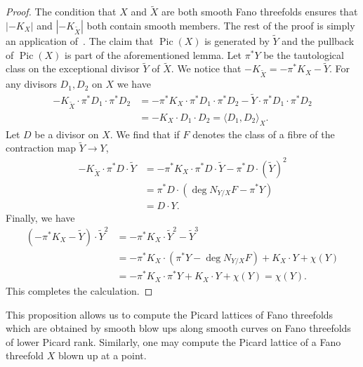 \documentclass[10pt]{amsart}
\numberwithin{equation}{section}
\theoremstyle{plain}
\theoremstyle{definition}
\theoremstyle{remark}
\DeclareMathOperator{\Pic}{Pic}
\begin{document}
\begin{proof}
  The condition that \(X\) and \(\widetilde{X}\) are both smooth Fano threefolds ensures that \(|-K_X|\) and \(|-K_{\widetilde{X}}|\) both contain smooth members. The rest of the proof is simply an application of~\cite[Lemma 2.11]{iskovskikh1977fano}. The claim that \(\Pic(X)\) is generated by \(\widetilde{Y}\) and the pullback of \(\Pic(X)\) is part of the aforementioned lemma. Let \(\pi^*Y\) be the tautological class on the exceptional divisor \(\widetilde{Y}\) of \(\widetilde{X}\). We notice that  \(-K_{\widetilde{X} }= -\pi^* K_X  - \widetilde{Y}\). For any divisors \(D_1,D_2\) on \(X\) we have
  \begin{align*}
    -K_{\widetilde{X}} \cdot \pi^* D_1 \cdot \pi^*D_2 &= -\pi^*K_X\cdot \pi^* D_1\cdot \pi^*D_2 - \widetilde{Y}\cdot \pi^* D_1 \cdot \pi^* D_2 \\
                                          & =  -K_X\cdot D_1\cdot D_2  = \langle D_1,D_2 \rangle_X.
  \end{align*}
  Let \(D\) be a divisor on \(X\). We find that if \(F\) denotes the class of a fibre of the contraction map \(\widetilde{Y}\rightarrow Y\),
  \begin{align*}
    -K_{\widetilde{X}} \cdot \pi^*D \cdot \widetilde{Y} & = -\pi^* K_X \cdot \pi^*D \cdot \widetilde{Y} - \pi^*D \cdot (\widetilde{Y})^2\\
                                              &= \pi^* D \cdot (\deg N_{Y/X} F - \pi^*Y) \\
                                              & = D \cdot Y.
  \end{align*}
  Finally, we have
  \begin{align*}
    (-\pi^*K_X - \widetilde{Y}) \cdot \widetilde{Y}^2 &= -\pi^*K_X \cdot \widetilde{Y}^2 - \widetilde{Y}^3 \\
                                                & = -\pi^* K_X \cdot (\pi^*Y - \deg N_{Y/X}F) + K_X \cdot Y + \chi(Y) \\
                                                & =  -\pi^*K_X\cdot \pi^* Y + K_X \cdot Y + \chi(Y) = \chi(Y).
  \end{align*}
  This completes the calculation.
\end{proof}

This proposition allows us to compute the Picard lattices of Fano threefolds which are obtained by smooth blow ups along smooth curves on Fano threefolds of lower Picard rank. Similarly, one may compute the Picard lattice of a Fano threefold \(X\) blown up at a point.
\end{document}
